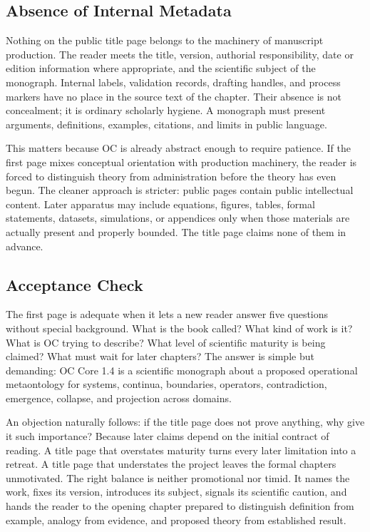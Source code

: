 \documentclass[11pt,a4paper,openany]{book}
\begin{document}
\subsection{Absence of Internal Metadata}
Nothing on the public title page belongs to the machinery of manuscript production. The reader meets the title, version, authorial responsibility, date or edition information where appropriate, and the scientific subject of the monograph. Internal labels, validation records, drafting handles, and process markers have no place in the source text of the chapter. Their absence is not concealment; it is ordinary scholarly hygiene. A monograph must present arguments, definitions, examples, citations, and limits in public language. \cite{stauffer_percolation,grimmett_percolation}\par
This matters because OC is already abstract enough to require patience. If the first page mixes conceptual orientation with production machinery, the reader is forced to distinguish theory from administration before the theory has even begun. The cleaner approach is stricter: public pages contain public intellectual content. Later apparatus may include equations, figures, tables, formal statements, datasets, simulations, or appendices only when those materials are actually present and properly bounded. The title page claims none of them in advance.\par
\subsection{Acceptance Check}
The first page is adequate when it lets a new reader answer five questions without special background. What is the book called? What kind of work is it? What is OC trying to describe? What level of scientific maturity is being claimed? What must wait for later chapters? The answer is simple but demanding: OC Core 1.4 is a scientific monograph about a proposed operational metaontology for systems, continua, boundaries, operators, contradiction, emergence, collapse, and projection across domains. \cite{stauffer_percolation,grimmett_percolation}\par
An objection naturally follows: if the title page does not prove anything, why give it such importance? Because later claims depend on the initial contract of reading. A title page that overstates maturity turns every later limitation into a retreat. A title page that understates the project leaves the formal chapters unmotivated. The right balance is neither promotional nor timid. It names the work, fixes its version, introduces its subject, signals its scientific caution, and hands the reader to the opening chapter prepared to distinguish definition from example, analogy from evidence, and proposed theory from established result.\par
\end{document}
